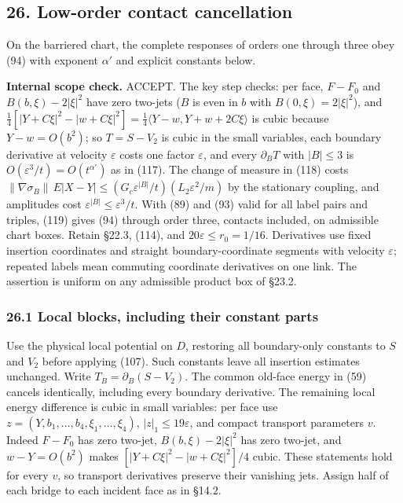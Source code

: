 \documentclass[11pt,a4paper]{article}
\begin{document}
\hypertarget{low-order-contact-cancellation}{%
\subsection{26. Low-order contact
cancellation}\label{low-order-contact-cancellation}}

On the barriered chart, the complete responses of orders one through
three obey (94) with exponent \(\alpha'\) and explicit constants below.

\textbf{Internal scope check.} ACCEPT. The key step checks: per face,
\(F-F_0\) and \(B(b,\xi)-2|\xi|^2\) have zero two-jets (\(B\) is even in
\(b\) with \(B(0,\xi)=2|\xi|^2\)), and
\(\frac14[|Y+C\xi|^2-|w+C\xi|^2]=\frac14\langle Y-w,Y+w+2C\xi\rangle\)
is cubic because \(Y-w=O(b^2)\); so \(T=S-V_2\) is cubic in the small
variables, each boundary derivative at velocity \(\varepsilon\) costs
one factor \(\varepsilon\), and every \(\partial_BT\) with \(|B|\le3\)
is \(O(\varepsilon^3/t)=O(t^{\alpha'})\) as in (117). The change of
measure in (118) costs
\(\|\nabla\sigma_B\|\,E|X-Y|\le(G_c\varepsilon^{|B|}/t)(L_2\varepsilon^2/m)\)
by the stationary coupling, and amplitudes cost
\(\varepsilon^{|B|}\le\varepsilon^3/t\). With (89) and (93) valid for
all label pairs and triples, (119) gives (94) through order three,
contacts included, on admissible chart boxes. Retain §22.3, (114), and
\(20\varepsilon\le r_0=1/16\). Derivatives use fixed insertion
coordinates and straight boundary-coordinate segments with velocity
\(\varepsilon\); repeated labels mean commuting coordinate derivatives
on one link. The assertion is uniform on any admissible product box of
§23.2.

\hypertarget{local-blocks-including-their-constant-parts}{%
\subsubsection{26.1 Local blocks, including their constant
parts}\label{local-blocks-including-their-constant-parts}}

Use the physical local potential on \(D\), restoring all boundary-only
constants to \(S\) and \(V_2\) before applying (107). Such constants
leave all insertion estimates unchanged. Write
\(T_B=\partial_B(S-V_2)\). The common old-face energy in (59) cancels
identically, including every boundary derivative. The remaining local
energy difference is cubic in small variables: per face use
\(z=(Y,b_1,\ldots,b_4,\xi_1,\ldots,\xi_4)\), \(|z|_1\le19\varepsilon\),
and compact transport parameters \(v\). Indeed \(F-F_0\) has zero
two-jet, \(B(b,\xi)-2|\xi|^2\) has zero two-jet, and \(w-Y=O(b^2)\)
makes \([|Y+C\xi|^2-|w+C\xi|^2]/4\) cubic. These statements hold for
every \(v\), so transport derivatives preserve their vanishing jets.
Assign half of each bridge to each incident face as in §14.2.
\end{document}
